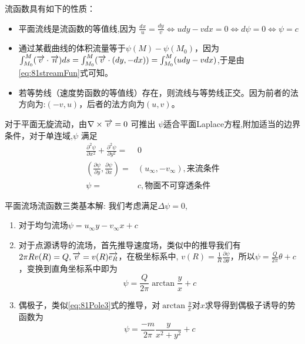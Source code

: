 流函数具有如下的性质：
\begin{itemize}
\item 平面流线是流函数的等值线,因为
$\frac{dx}{u}=\frac{dy}{v}\Leftrightarrow udy-vdx=0 \Leftrightarrow d\psi=0 \Leftrightarrow \psi=c$
\item 通过某截曲线的体积流量等于$\psi(M)-\psi(M_0)$，因为
$\int_{M_0}^M (\overrightarrow{v}\cdot \overrightarrow{n})ds=\int_{M_0}^M (\overrightarrow{v}\cdot (dy,-dx))=\int_{M_0}^M (udy-vdx)$,于是由\eqref{eq:81streamFun}式可知。
\item 若等势线（速度势函数的等值线）存在，则流线与等势线正交。因为前者的法方向为:$(-v,u)$，后者的法方向为$(u,v)$。
\end{itemize}

对于平面无旋流动，由$\nabla\times \overrightarrow{v}=0$ 可推出 $\psi$适合平面Laplace方程,附加适当的边界条件，对于单连域,$\psi$
满足
\begin{align}
\frac{\partial^2 \psi}{\partial x^2}+\frac{\partial^2 \psi}{\partial y^2}=&0\nonumber\\
(\frac{\partial \psi}{\partial y},\frac{\partial \psi}{\partial x})=&(u_{\infty},-v_{\infty}),\text{来流条件} \nonumber\\
\psi=&c,\text{物面不可穿透条件}
\end{align}

平面流场流函数三类基本解:
我们考虑满足$\Delta \psi=0$,
\begin{enumerate}
\item 对于均匀流场$\psi=u_{\infty}y-v_{\infty}x+c$
\item 对于点源诱导的流场，首先推导速度场，类似中的推导我们有$2\pi R v(R)=Q,\overrightarrow{v}=v(R)\overrightarrow{e_R}$，在极坐标系中,
$v(R)=\frac{1}{R}\frac{\partial \psi}{\partial \theta}$，所以$\psi=\frac{Q}{2\pi}\theta+c$，变换到直角坐标系中即为
\begin{equation}
\psi=\frac{Q}{2\pi}\arctan\frac{y}{x}+c
\end{equation}
\item 偶极子，类似\eqref{eq:81Pole3}式的推导，对$\arctan\frac{y}{x}$对$x$求导得到偶极子诱导的势函数为
\begin{equation}
\psi=\frac{-m}{2\pi}\frac{y}{x^2+y^2}+c
\end{equation}
\end{enumerate}
